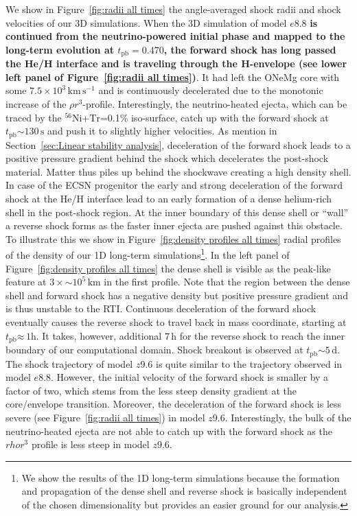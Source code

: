 \documentclass[fleqn,usenatbib]{mnras}
\newcommand{\tpb}{\ensuremath{t_{\text{pb}}}}
\newcommand{\nickel}{\ensuremath{\mathrm{^{56}Ni}}\xspace}
\newcommand{\tracer}{\ensuremath{\mathrm{Tr}}\xspace}
\newcommand{\kms}{\ensuremath{\mathrm{km\, s^{-1}}}}
\newcommand{\s}{\ensuremath{\text{s}}}
\begin{document}
We show in Figure~\ref{fig:radii all times} the angle-averaged shock radii and shock velocities of our 3D simulations.
When the 3D simulation of model $e8.8$ \textbf{is continued from the neutrino-powered initial phase and mapped to the long-term evolution at $\tpb=0.470$, the forward shock has long passed the He/H interface and is traveling through the H-envelope (see lower left panel of Figure~\ref{fig:radii all times})}. It had left the ONeMg core with some $7.5\times 10^{3}\,\kms$ and is continuously decelerated due to the monotonic increase of the $\rho r^3$-profile.
Interestingly, the neutrino-heated ejecta, which can be traced by the \nickel+\tracer=0.1\% iso-surface, catch up with the forward shock at $\tpb\mathord{\sim}130\,\s$ and push it to slightly higher velocities. 
As mention in Section~\ref{sec:Linear stability analysis}, deceleration of the forward shock leads to a positive pressure gradient behind the shock which decelerates the post-shock material. Matter thus piles up behind the shockwave creating a high density shell. In case of the ECSN progenitor the early and strong deceleration of the forward shock at the He/H interface lead to an early formation of a dense helium-rich shell in the post-shock region. At the inner boundary of this dense shell or ``wall'' \citep{Kifonidis2006} a reverse shock forms as the faster inner ejecta are pushed against this obstacle. To illustrate this we show in Figure~\ref{fig:density profiles all times} radial profiles of the density of our 1D long-term simulations\footnote{We show the results of the 1D long-term simulations because the formation and propagation of the dense shell and reverse shock is basically independent of the chosen dimensionality but provides an easier ground for our analysis. }. In the left panel of Figure~\ref{fig:density profiles all times} the dense shell is visible as the peak-like feature at $3\times\mathord{\sim}10^{5}\,\mathrm{km}$ in the first profile. Note that the region between the dense shell and forward shock has a negative density but positive pressure gradient and is thus unstable to the RTI.
Continuous deceleration of the forward shock eventually causes the reverse shock to travel back in mass coordinate, starting at  $\tpb\mathord{\approx}\,1\text{h}$. It takes, however, additional $7\,\text{h}$ for the reverse shock to reach the inner boundary of our computational domain. Shock breakout is observed at $\tpb\mathord{\sim}5\,\text{d}$.
The shock trajectory of model $z9.6$ is quite similar to the trajectory observed in model $e8.8$. However, the initial velocity of the forward shock is smaller by a factor of two, which stems from the less steep density gradient at the core/envelope transition. Moreover, the deceleration of the forward shock is less severe (see Figure~\ref{fig:radii all times}) in model $z9.6$. Interestingly, the bulk of the neutrino-heated ejecta are not able to catch up with the forward shock as the $rho r^3$ profile is less steep in model $z9.6$. 
\end{document}
